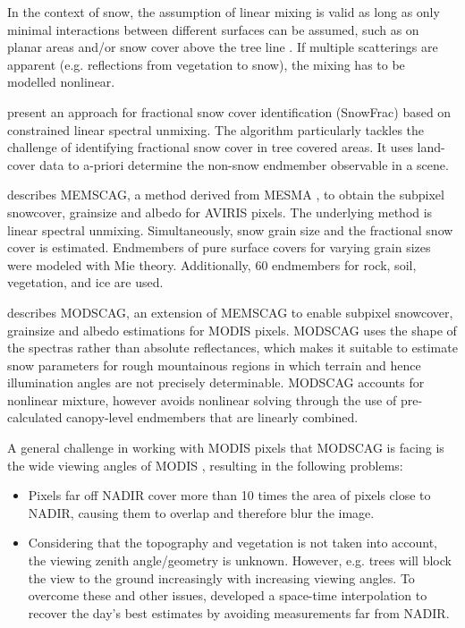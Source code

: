 \documentclass[a4paper,10pt]{article}
\begin{document}
In the context of snow, the assumption of linear mixing is valid as long as only minimal interactions between different surfaces can be assumed, such as on planar areas and/or snow cover above the tree line \citep{Painter2009}. If multiple scatterings are apparent (e.g. reflections from vegetation to snow), the mixing has to be modelled nonlinear.

\cite{Vikhamar2003} present an approach for fractional snow cover identification (SnowFrac) based on constrained linear spectral unmixing. The algorithm particularly tackles the challenge of identifying fractional snow cover in tree covered areas. It uses land-cover data to a-priori determine the non-snow endmember observable in a scene.

\citep{Painter2003} describes \gls{MEMSCAG}, a method derived from \gls{MESMA} \citep{Roberts1998}, to obtain the subpixel snowcover, grainsize and albedo for \gls{AVIRIS} pixels. The underlying method is linear spectral unmixing. Simultaneously, snow grain size and the fractional snow cover is estimated. Endmembers of pure surface covers for varying grain sizes were modeled with Mie theory. Additionally, 60 endmembers for rock, soil, vegetation, and ice are used.

\Cite{Painter2009} describes \gls{MODSCAG}, an extension of \gls{MEMSCAG} to enable subpixel snowcover, grainsize and albedo estimations for \gls{MODIS} pixels. \gls{MODSCAG} uses the shape of the spectras rather than absolute reflectances, which makes it suitable to estimate snow parameters for rough mountainous regions in which terrain and hence illumination angles are not precisely determinable. \gls{MODSCAG} accounts for nonlinear mixture, however avoids nonlinear solving through the use of pre-calculated canopy-level endmembers that are linearly combined.

A general challenge in working with \gls{MODIS} pixels that \gls{MODSCAG} is facing is the wide viewing angles of \gls{MODIS} \citep{Dozier2009, Dozier2008, Liu2008}, resulting in the following problems:
\begin{itemize}
 \item Pixels far off NADIR cover more than 10 times the area of pixels close to NADIR, causing them to overlap and therefore blur the image.
 \item Considering that the topography and vegetation is not taken into account, the viewing zenith angle/geometry is unknown. However, e.g. trees will block the view to the ground increasingly with increasing viewing angles.
To overcome these and other issues, \cite{Dozier2008} developed a space-time interpolation to recover the day's best estimates by avoiding measurements far from NADIR.
\end{itemize}
\end{document}
